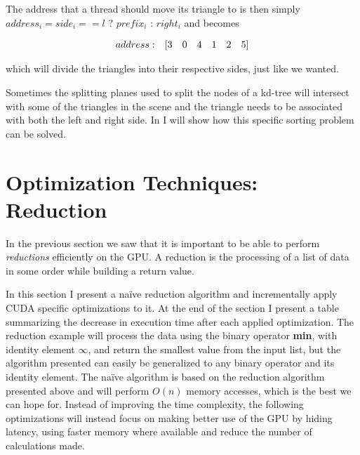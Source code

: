 The address that a thread should move its triangle to is then simply $address_i
= side_i == l$ ? $prefix_i$ : $right_i$ and becomes


\begin{displaymath}
  \begin{array} {r r r r r r r}
    address: & [3 & 0 & 4 & 1 & 2 & 5]
  \end{array}
\end{displaymath}

which will divide the triangles into their respective sides, just like
we wanted.

Sometimes the splitting planes used to split the nodes of a kd-tree will
intersect with some of the triangles in the scene and the triangle needs to be
associated with both the left and right side. In  I
will show how this specific sorting problem can be solved.





\section{Optimization Techniques: Reduction}\label{sec:reduce}


In the previous section we saw that it is important to be able to perform
\textit{reductions} efficiently on the GPU. A reduction is the processing of a
list of data in some order while building a return value.


In this section I present a naïve reduction algorithm and incrementally apply
CUDA specific optimizations to it. At the end of the section I present a table
summarizing the decrease in execution time after each applied optimization. The
reduction example will process the data using the binary operator \textbf{min},
with identity element $\infty$, and return the smallest value from the input
list, but the algorithm presented can easily be generalized to any binary
operator and its identity element. The naïve algorithm is based on the reduction
algorithm presented above and will perform $O(n)$ memory accesses, which is the
best we can hope for. Instead of improving the time complexity, the following
optimizations will instead focus on making better use of the GPU by hiding
latency, using faster memory where available and reduce the number of
calculations made.

